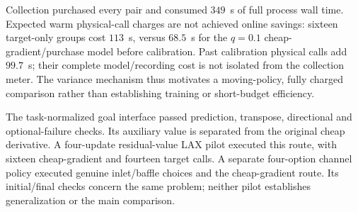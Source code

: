 Collection purchased every pair and consumed $349$~s of full process wall time. Expected warm physical-call charges are not achieved online savings: sixteen target-only groups cost $113$~s, versus $68.5$~s for the $q=0.1$ cheap-gradient/purchase model before calibration. Past calibration physical calls add $99.7$~s; their complete model/recording cost is not isolated from the collection meter. The variance mechanism thus motivates a moving-policy, fully charged comparison rather than establishing training or short-budget efficiency.

The task-normalized goal interface passed prediction, transpose, directional and optional-failure checks. Its auxiliary value is separated from the original cheap derivative. A four-update residual-value LAX pilot executed this route, with sixteen cheap-gradient and fourteen target calls. A separate four-option channel policy executed genuine inlet/baffle choices and the cheap-gradient route. Its initial/final checks concern the same problem; neither pilot establishes generalization or the main comparison.

